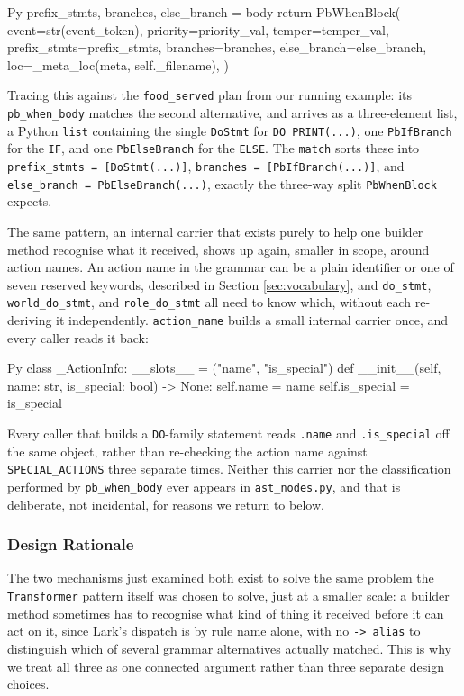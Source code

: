 \begin{codeblock}[]{Py}
prefix_stmts, branches, else_branch = body
return PbWhenBlock(
    event=str(event_token),
    priority=priority_val,
    temper=temper_val,
    prefix_stmts=prefix_stmts,
    branches=branches,
    else_branch=else_branch,
    loc=_meta_loc(meta, self._filename),
)
\end{codeblock}
Tracing this against the \lstinline|food_served| plan from our running example: its \lstinline|pb_when_body| matches the second alternative, and arrives as a three-element list, a Python \lstinline|list| containing the single \lstinline|DoStmt| for \lstinline|DO PRINT(...)|, one \lstinline|PbIfBranch| for the \lstinline|IF|, and one \lstinline|PbElseBranch| for the \lstinline|ELSE|. The \lstinline|match| sorts these into \lstinline|prefix_stmts = [DoStmt(...)]|, \lstinline|branches = [PbIfBranch(...)]|, and \lstinline|else_branch = PbElseBranch(...)|, exactly the three-way split \lstinline|PbWhenBlock| expects.

The same pattern, an internal carrier that exists purely to help one builder method recognise what it received, shows up again, smaller in scope, around action names. An action name in the grammar can be a plain identifier or one of seven reserved keywords, described in Section \ref{sec:vocabulary}, and \lstinline|do_stmt|, \lstinline|world_do_stmt|, and \lstinline|role_do_stmt| all need to know which, without each re-deriving it independently. \lstinline|action_name| builds a small internal carrier once, and every caller reads it back:
\begin{codeblock}[]{Py}
class _ActionInfo:
    __slots__ = ("name", "is_special")
    def __init__(self, name: str, is_special: bool) -> None:
        self.name = name
        self.is_special = is_special
\end{codeblock}
Every caller that builds a \lstinline|DO|-family statement reads \lstinline|.name| and \lstinline|.is_special| off the same object, rather than re-checking the action name against \lstinline|SPECIAL_ACTIONS| three separate times. Neither this carrier nor the classification performed by \lstinline|pb_when_body| ever appears in \lstinline|ast_nodes.py|, and that is deliberate, not incidental, for reasons we return to below.

\subsubsection{Design Rationale}
The two mechanisms just examined both exist to solve the same problem the \lstinline|Transformer| pattern itself was chosen to solve, just at a smaller scale: a builder method sometimes has to recognise what kind of thing it received before it can act on it, since Lark's dispatch is by rule name alone, with no \lstinline|-> alias| to distinguish which of several grammar alternatives actually matched. This is why we treat all three as one connected argument rather than three separate design choices.

